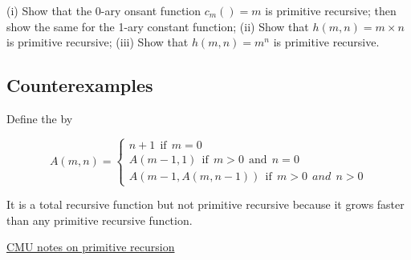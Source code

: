  (i) Show that the 0-ary onsant function $c_m() = m$ is primitive recursive; then show the same for the 1-ary constant function; (ii) Show that $h(m,n) = m\times n$ is primitive recursive; (iii) Show that $h(m,n) = m^n$ is primitive recursive.


\subsection{Counterexamples}

Define the  by 

$$
A(m,n) = \begin{cases}
               n+ 1 \ \ \text{if} \ \ m = 0\\
              A(m-1,1) \ \ \text{if} \ \ m > 0 \ \ \text{and} \ \ n = 0 \\
              A(m-1,A(m,n-1)) \ \ \text{if} \ \ m > 0 \ \ and \ \ n > 0
            \end{cases}
$$

It is a total recursive function but not primitive recursive because it grows faster than any primitive recursive function.


\href{https://www.andrew.cmu.edu/user/kk3n/complearn/chapter2.pdf}{CMU notes on primitive recursion}